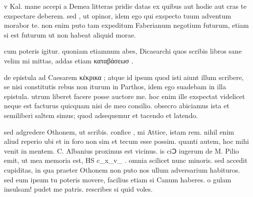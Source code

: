 


 v Kal. mane accepi a Demea litteras pridie datas ex quibus aut hodie aut cras te exspectare deberem. sed , ut opinor, idem ego qui exspecto tuum adventum morabor te. non enim puto tam expeditum Faberianum negotium futurum, etiam si est futurum ut non habeat aliquid morae.

 cum poteris igitur. quoniam etiamnum abes, Dicaearchi quos scribis libros sane velim mi mittas, addas etiam καταβάσεωσ .

 de epistula ad Caesarem κέκρικα ; atque id ipsum quod isti aiunt illum scribere, se nisi constitutis rebus non iturum in Parthos, idem ego suadebam in illa epistula. utrum liberet facere posse auctore me. hoc enim ille exspectat videlicet neque est facturus quicquam nisi de meo consilio. obsecro abiciamus ista et semiliberi saltem simus; quod adsequemur et tacendo et latendo.

 sed adgredere Othonem, ut scribis. confice , mi Attice, istam rem. nihil enim aliud reperio ubi et in foro non sim et tecum esse possim. quanti autem, hoc mihi venit in mentem. C. Albanius proximus est vicinus. is ciↃ iugerum de M. Pilio emit, ut mea memoria est, HS c_x_v_ . omnia scilicet nunc minoris. sed accedit cupiditas, in qua praeter Othonem non puto nos ullum adversarium habituros. sed eum ipsum tu poteris movere, facilius etiam si Canum haberes. o gulam insulsam! pudet me patris. rescribes si quid voles.
